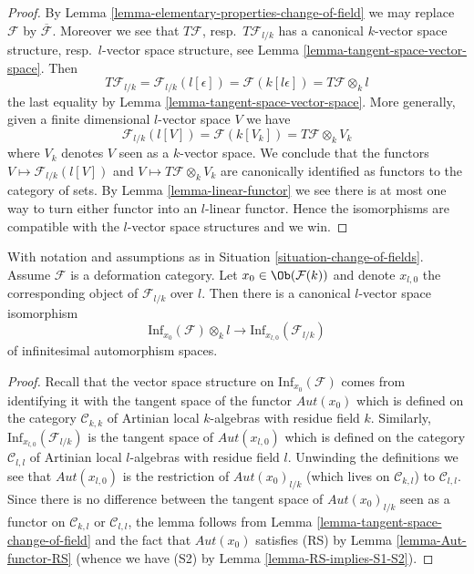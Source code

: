 \begin{proof}
By Lemma \ref{lemma-elementary-properties-change-of-field} we may replace
$\mathcal{F}$ by $\overline{\mathcal{F}}$. Moreover we see that
$T\mathcal{F}$, resp.\ $T\mathcal{F}_{l/k}$ has a canonical
$k$-vector space structure, resp.\ $l$-vector space structure, see
Lemma \ref{lemma-tangent-space-vector-space}. Then
$$
T\mathcal{F}_{l/k} = \mathcal{F}_{l/k}(l[\epsilon])
= \mathcal{F}(k[l\epsilon]) = T\mathcal{F} \otimes_k l
$$
the last equality by Lemma \ref{lemma-tangent-space-vector-space}.
More generally, given a finite dimensional $l$-vector space $V$ we have
$$
\mathcal{F}_{l/k}(l[V]) = \mathcal{F}(k[V_k]) = T\mathcal{F} \otimes_k V_k
$$
where $V_k$ denotes $V$ seen as a $k$-vector space. We conclude that
the functors $V \mapsto \mathcal{F}_{l/k}(l[V])$ and
$V \mapsto T\mathcal{F} \otimes_k V_k$ are canonically identified
as functors to the category of sets. By Lemma \ref{lemma-linear-functor}
we see there is at most one way to turn either functor into an $l$-linear
functor. Hence the isomorphisms are compatible with the $l$-vector space
structures and we win.
\end{proof}

\begin{lemma}
\label{lemma-inf-aut-change-of-field}
With notation and assumptions as in Situation \ref{situation-change-of-fields}.
Assume $\mathcal{F}$ is a deformation category. Let
$x_0 \in \Ob(\mathcal{F}(k))$ and denote $x_{l, 0}$ the corresponding
object of $\mathcal{F}_{l/k}$ over $l$. Then there is a
canonical $l$-vector space isomorphism
$$
\text{Inf}_{x_0}(\mathcal{F}) \otimes_k l
\longrightarrow
\text{Inf}_{x_{l, 0}}(\mathcal{F}_{l/k})
$$
of infinitesimal automorphism spaces.
\end{lemma}

\begin{proof}
Recall that the vector space structure on
$\text{Inf}_{x_0}(\mathcal{F})$ comes from identifying it with the tangent
space of the functor $\mathit{Aut}(x_0)$ which is defined on
the category $\mathcal{C}_{k, k}$ of Artinian local $k$-algebras with
residue field $k$. Similarly, $\text{Inf}_{x_{l, 0}}(\mathcal{F}_{l/k})$
is the tangent space of $\mathit{Aut}(x_{l, 0})$ which is defined on the
category $\mathcal{C}_{l, l}$ of Artinian local $l$-algebras with residue
field $l$. Unwinding the definitions we see that
$\mathit{Aut}(x_{l, 0})$ is the restriction of $\mathit{Aut}(x_0)_{l/k}$
(which lives on $\mathcal{C}_{k, l}$) to $\mathcal{C}_{l, l}$. Since
there is no difference between the tangent space of
$\mathit{Aut}(x_0)_{l/k}$ seen as a functor on $\mathcal{C}_{k, l}$ or
$\mathcal{C}_{l, l}$, the lemma follows from 
Lemma \ref{lemma-tangent-space-change-of-field}
and the fact that $\mathit{Aut}(x_0)$ satisfies (RS) by
Lemma \ref{lemma-Aut-functor-RS} (whence we have (S2) by
Lemma \ref{lemma-RS-implies-S1-S2}).
\end{proof}


